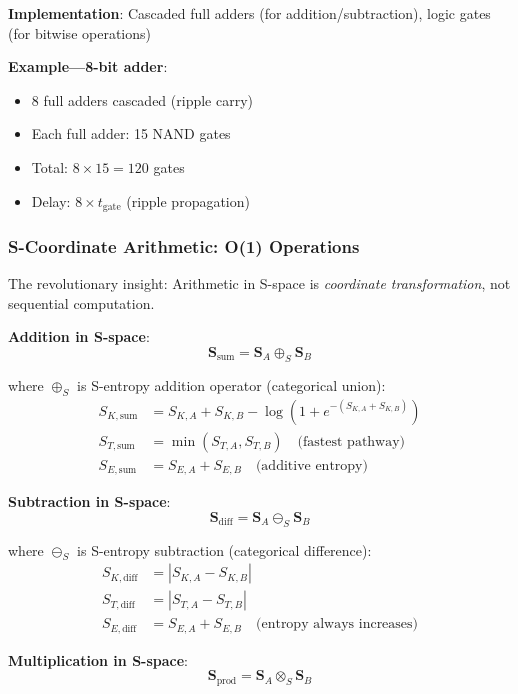 \documentclass[11pt,a4paper]{article}
\begin{document}
\textbf{Implementation}: Cascaded full adders (for addition/subtraction), logic gates (for bitwise operations)

\textbf{Example—8-bit adder}:
\begin{itemize}
\item 8 full adders cascaded (ripple carry)
\item Each full adder: 15 NAND gates
\item Total: $8 \times 15 = 120$ gates
\item Delay: $8 \times t_{\text{gate}}$ (ripple propagation)
\end{itemize}

\subsubsection{S-Coordinate Arithmetic: O(1) Operations}

The revolutionary insight: Arithmetic in S-space is \textit{coordinate transformation}, not sequential computation.

\textbf{Addition in S-space}:
\begin{equation}
\mathbf{S}_{\text{sum}} = \mathbf{S}_A \oplus_S \mathbf{S}_B
\end{equation}

where $\oplus_S$ is S-entropy addition operator (categorical union):
\begin{align}
S_{K,\text{sum}} &= S_{K,A} + S_{K,B} - \log(1 + e^{-(S_{K,A} + S_{K,B})}) \\
S_{T,\text{sum}} &= \min(S_{T,A}, S_{T,B}) \quad \text{(fastest pathway)} \\
S_{E,\text{sum}} &= S_{E,A} + S_{E,B} \quad \text{(additive entropy)}
\end{align}

\textbf{Subtraction in S-space}:
\begin{equation}
\mathbf{S}_{\text{diff}} = \mathbf{S}_A \ominus_S \mathbf{S}_B
\end{equation}

where $\ominus_S$ is S-entropy subtraction (categorical difference):
\begin{align}
S_{K,\text{diff}} &= |S_{K,A} - S_{K,B}| \\
S_{T,\text{diff}} &= |S_{T,A} - S_{T,B}| \\
S_{E,\text{diff}} &= S_{E,A} + S_{E,B} \quad \text{(entropy always increases)}
\end{align}

\textbf{Multiplication in S-space}:
\begin{equation}
\mathbf{S}_{\text{prod}} = \mathbf{S}_A \otimes_S \mathbf{S}_B
\end{equation}
\end{document}
